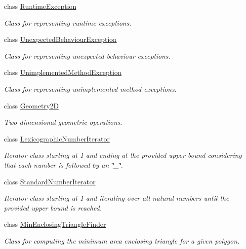 \begin{DoxyCompactItemize}
class \hyperlink{classmultiscale_1_1RuntimeException}{\-Runtime\-Exception}
\begin{DoxyCompactList}\small\item\em \-Class for representing runtime exceptions. \end{DoxyCompactList}\item 
class \hyperlink{classmultiscale_1_1UnexpectedBehaviourException}{\-Unexpected\-Behaviour\-Exception}
\begin{DoxyCompactList}\small\item\em \-Class for representing unexpected behaviour exceptions. \end{DoxyCompactList}\item 
class \hyperlink{classmultiscale_1_1UnimplementedMethodException}{\-Unimplemented\-Method\-Exception}
\begin{DoxyCompactList}\small\item\em \-Class for representing unimplemented method exceptions. \end{DoxyCompactList}\item 
class \hyperlink{classmultiscale_1_1Geometry2D}{\-Geometry2\-D}
\begin{DoxyCompactList}\small\item\em \-Two-\/dimensional geometric operations. \end{DoxyCompactList}\item 
class \hyperlink{classmultiscale_1_1LexicographicNumberIterator}{\-Lexicographic\-Number\-Iterator}
\begin{DoxyCompactList}\small\item\em \-Iterator class starting at 1 and ending at the provided upper bound considering that each number is followed by an \char`\"{}\-\_\-\char`\"{}. \end{DoxyCompactList}\item 
class \hyperlink{classmultiscale_1_1StandardNumberIterator}{\-Standard\-Number\-Iterator}
\begin{DoxyCompactList}\small\item\em \-Iterator class starting at 1 and iterating over all natural numbers until the provided upper bound is reached. \end{DoxyCompactList}\item 
class \hyperlink{classmultiscale_1_1MinEnclosingTriangleFinder}{\-Min\-Enclosing\-Triangle\-Finder}
\begin{DoxyCompactList}\small\item\em \-Class for computing the minimum area enclosing triangle for a given polygon. \end{DoxyCompactList}\item 

\end{DoxyCompactItemize}
